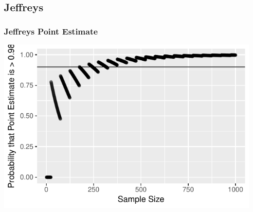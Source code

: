 \documentclass{beamer}\usepackage{knitr}
\begin{document}
% 
% 
% 



\subsection{Jeffreys}

\begin{frame}
\frametitle{Jeffreys Point Estimate}
\begin{knitrout}
\color{fgcolor}

{\centering \includegraphics[width=\linewidth]{figure/plot_Jeffreys_1-1} 

}



\end{knitrout}
\end{frame}
\end{document}
